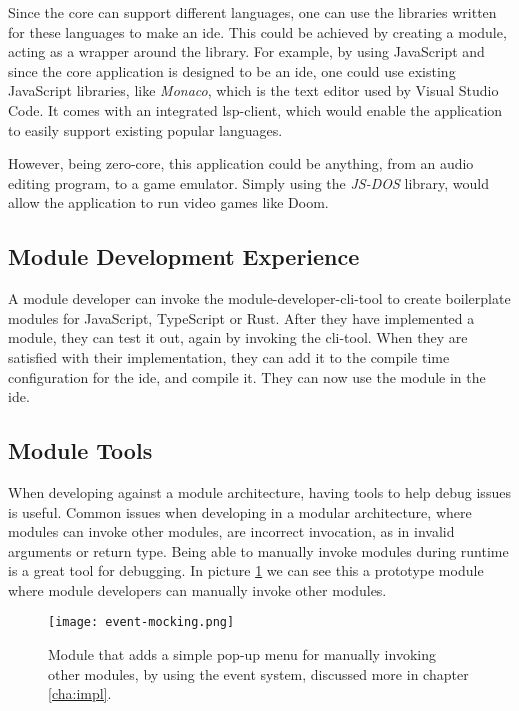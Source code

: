 Since the core can support different languages, one can use the libraries
written for these languages to make an \gls*{ide}. This could be achieved by
creating a module, acting as a wrapper around the library. For example, by
using JavaScript and since the core application is designed to be an \gls*{ide},
one could use existing JavaScript libraries, like \textit{Monaco}, which is the
text editor used by Visual Studio Code. It comes with an integrated
\gls*{lsp}-client, which would enable the application to easily support existing
popular languages.

However, being zero-core, this application could be anything, from an audio
editing program, to a game emulator. Simply using the \textit{JS-DOS} library,
would allow the application to run video games like Doom.

\subsection{Module Development Experience}

A module developer can invoke the module-developer-\gls*{cli}-tool to create
boilerplate modules for JavaScript, TypeScript or Rust. After they have
implemented a module, they can test it out, again by invoking the
\gls*{cli}-tool. When they are satisfied with their implementation, they can add
it to the compile time configuration for the \gls*{ide}, and compile it. They
can now use the module in the \gls*{ide}.

\subsection{Module Tools}

When developing against a module architecture, having tools to help debug issues
is useful. Common issues when developing in a modular architecture, where
modules can invoke other modules, are incorrect invocation, as in invalid
arguments or return type. Being able to manually invoke modules during runtime
is a great tool for debugging. In picture \ref{pic:eventMock} we can see this a
prototype module where module developers can manually invoke other modules.

\begin{figure}[H]
  \centering
  \texttt{[image: event-mocking.png]}
  \caption{
    Module that adds a simple pop-up menu for manually invoking other modules,
    by using the event system, discussed more in chapter \ref{cha:impl}.
  }
  \label{pic:eventMock}
\end{figure}

